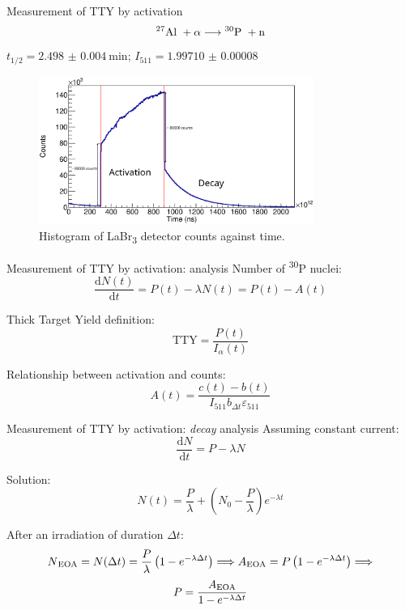 \documentclass[11pt]{beamer}
\newcommand{\dif}{\text{d}}
\newcommand{\ddt}[1]{\frac{\dif #1}{\dif t}}
\newcommand{\Aliso}{\textsuperscript{27}Al }
\newcommand{\Piso}{\textsuperscript{30}P }
\begin{document}
\begin{frame}{Measurement of TTY by activation}
	\[ \text{\Aliso} + \alpha \longrightarrow \text{\Piso} + \text{n}   \]
	\centering
	$t_{1/2} = \qty{2.498(4)}{\minute}$; 
	$I_{511} = \num{1.99710(8)}$
	\begin{figure}[H]
		\centering
		\includegraphics[width=0.80\textwidth]{example_activation_time_histogram.eps}
		\caption{Histogram of LaBr\textsubscript{3} detector counts against time.}
		\label{example_activation_time_histogram}
	\end{figure}
\end{frame}

\begin{frame}{Measurement of TTY by activation: analysis}
	Number of \Piso nuclei:
	\begin{equation}
		\ddt{N(t)} = P(t) -\lambda N(t) = P(t) - A(t)
		\label{general_diffeq}
	\end{equation}

	Thick Target Yield definition:
	\begin{equation}
		\text{TTY} = \frac{P(t)}{I_\alpha(t)}
	\end{equation}

	Relationship between activation and counts:
	\begin{equation}
		A(t) = \frac{c(t) - b(t)}{I_{511} b_{\Delta t} \varepsilon_{511}}
	\end{equation}
\end{frame}

\begin{frame}{Measurement of TTY by activation: \textit{decay} analysis}
	Assuming constant current:
	\begin{equation}
		\ddt{N} = P -\lambda N
	\end{equation}

	Solution:
	\begin{equation}
		N(t) = \frac{P}{\lambda} + \left(  N_0 - \frac{P}{\lambda}  \right) e^{-\lambda t}
	\end{equation}

	After an irradiation of duration $\Delta t$:
	\[ N\textsubscript{EOA} =N(\Delta t) = \frac{P}{\lambda} \left(1 - e^{-\lambda \Delta t} \right)\Longrightarrow A\textsubscript{EOA}=P\left(1-e^{-\lambda\Delta t}\right)\Longrightarrow \]
	\begin{equation}
		P = \frac{A\textsubscript{EOA}}{1 - e^{-\lambda \Delta t}}
	\end{equation}
\end{frame}
\end{document}
